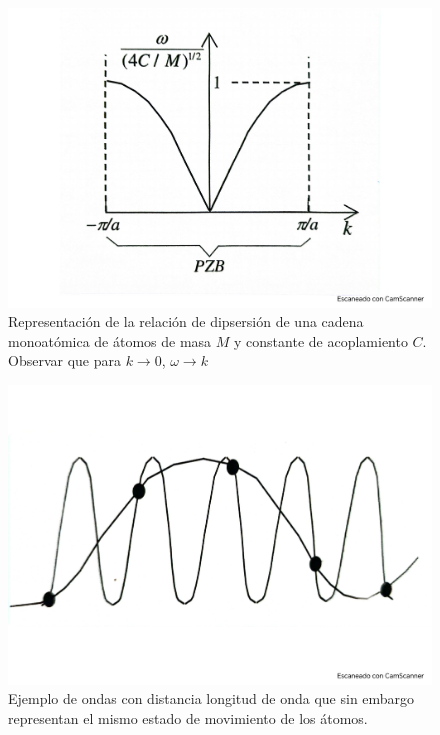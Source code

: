 \begin{figure}[h!] \centering
    \includegraphics[scale=0.5]{Cuerpo/Ch_04/Fotos libro 2.pdf}
    \caption{Representación de la relación de dipsersión de una cadena monoatómica de átomos de masa $M$ y constante de acoplamiento $C$. Observar que para $k\rightarrow 0$, $\omega \rightarrow k$}
    \label{Fig:04-02}
\end{figure}    

\begin{figure}[h!] \centering
    \includegraphics[scale=0.5]{Cuerpo/Ch_04/Fotos libro 3.pdf}
    \caption{Ejemplo de ondas con distancia longitud de onda que sin embargo representan el mismo estado de movimiento de los átomos.}
    \label{Fig:04-03}
\end{figure}    

